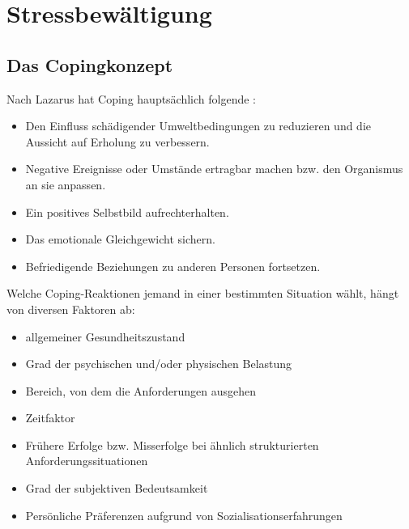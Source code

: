 \section{Stressbewältigung}

\subsection{Das Copingkonzept}



Nach Lazarus hat Coping hauptsächlich folgende
:
\begin{itemize}
  \item Den Einfluss schädigender Umweltbedingungen zu
  reduzieren und die Aussicht auf Erholung zu verbessern.
  \item Negative Ereignisse oder Umstände ertragbar machen
  bzw. den Organismus an sie anpassen.
  \item Ein positives Selbstbild aufrechterhalten.
  \item Das emotionale Gleichgewicht sichern.
  \item Befriedigende Beziehungen zu anderen Personen fortsetzen.
\end{itemize}

Welche Coping-Reaktionen jemand in einer bestimmten
Situation wählt, hängt von diversen Faktoren ab:
\begin{itemize}
  \item allgemeiner Gesundheitszustand
  \item Grad der psychischen und/oder physischen Belastung
  \item Bereich, von dem die Anforderungen ausgehen
  \item Zeitfaktor
  \item Frühere Erfolge bzw. Misserfolge bei ähnlich
  strukturierten Anforderungssituationen
  \item Grad der subjektiven Bedeutsamkeit
  \item Persönliche Präferenzen aufgrund von Sozialisationserfahrungen
\end{itemize}


